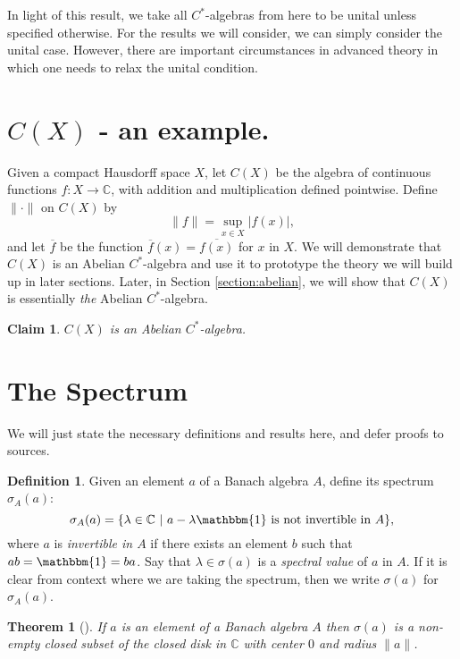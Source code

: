 \documentclass[12pt,a4paper]{report}
\theoremstyle{plain}
\newtheorem*{thm*}{Theorem}
\newtheorem*{claim}{Claim}
\theoremstyle{definition}
\newtheorem{defn}{Definition}
\newcommand{\1}{\mathbbm{1}}
\newcommand{\C}{\mathbb{C}}
\newcommand{\CX}{C(X)}
\newcommand{\spec}[1]{\sigma(#1)}
\begin{document}
In light of this result, we take all $C^\ast$-algebras from here to be unital unless
specified otherwise.
For the results we will consider, we can simply consider the unital case. 
However, there are important circumstances in advanced theory in which one 
needs to relax the unital condition.


\section{$\CX$ - an example.}
Given a compact Hausdorff space $X$, let $\CX$ be the algebra of continuous functions
$f:X\to\C$, with addition and multiplication defined pointwise. Define $\|\cdot\|$ on $\CX$ by
\[
	\|f\|= \sup_{x\in X}{|f(x)|},
\]
and let $\overline f$ be the function $\overline f(x) = \overline{f(x)}$ for $x$ in $X$.
We will demonstrate that $\CX$ is an Abelian $C^\ast$-algebra and use it to prototype the theory
we will build up in later sections. Later, in Section \ref{section:abelian}, we will show that $\CX$ is 
essentially \emph{the} Abelian $C^\ast$-algebra.

\begin{claim}
	$\CX$ is an Abelian $C^\ast$-algebra.
\end{claim}






\section{The Spectrum}
We will just state the necessary definitions and results here, and defer proofs to sources.

\begin{defn}
	Given an element $a$ of a Banach algebra $A$, define its spectrum $\sigma_A(a)$:
	\[
		\sigma_A(a)=\{\lambda\in \C ~|~ a-\lambda\1 \mbox{ is not invertible in }A\},
	\]
	where $a$ is \emph{invertible in $A$} if there exists an element $b$ such that $ab=\1=ba$. 
	Say that $\lambda\in\spec a$ is a \emph{spectral value} of $a$ in $A$. If it is clear from context 
	where we are taking the spectrum, then we write $\spec{a}$ for $\sigma_A(a)$. 
\end{defn}

\begin{thm*}[{\cite[3.2.3]{kadison83}}]
	If $a$ is an element of a Banach algebra $A$ then $\spec a$ is a non-empty closed subset of the
	closed disk in $\C$ with center $0$ and radius $\|a\|$.
\end{thm*}
\end{document}
